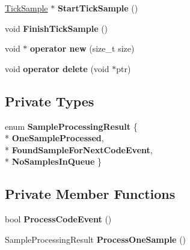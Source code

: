 \begin{DoxyCompactItemize}
\item 
\hyperlink{structv8_1_1internal_1_1_tick_sample}{Tick\+Sample} $\ast$ {\bfseries Start\+Tick\+Sample} ()\hypertarget{classv8_1_1internal_1_1_profiler_events_processor_a10c94b12e3cabf79f33f1e0bd8281dff}{}\label{classv8_1_1internal_1_1_profiler_events_processor_a10c94b12e3cabf79f33f1e0bd8281dff}

\item 
void {\bfseries Finish\+Tick\+Sample} ()\hypertarget{classv8_1_1internal_1_1_profiler_events_processor_a142c38fa289330b932097ac0705bf6ac}{}\label{classv8_1_1internal_1_1_profiler_events_processor_a142c38fa289330b932097ac0705bf6ac}

\item 
void $\ast$ {\bfseries operator new} (size\+\_\+t size)\hypertarget{classv8_1_1internal_1_1_profiler_events_processor_ac90fe204c70433ce94e4125125b78b47}{}\label{classv8_1_1internal_1_1_profiler_events_processor_ac90fe204c70433ce94e4125125b78b47}

\item 
void {\bfseries operator delete} (void $\ast$ptr)\hypertarget{classv8_1_1internal_1_1_profiler_events_processor_a9595db1768685aaba247596a6ea5e8f7}{}\label{classv8_1_1internal_1_1_profiler_events_processor_a9595db1768685aaba247596a6ea5e8f7}

\end{DoxyCompactItemize}
\subsection*{Private Types}
\begin{DoxyCompactItemize}
\item 
enum {\bfseries Sample\+Processing\+Result} \{ \\*
{\bfseries One\+Sample\+Processed}, 
\\*
{\bfseries Found\+Sample\+For\+Next\+Code\+Event}, 
\\*
{\bfseries No\+Samples\+In\+Queue}
 \}\hypertarget{classv8_1_1internal_1_1_profiler_events_processor_a1e04e270f39aeb3c99488ce1e65eb154}{}\label{classv8_1_1internal_1_1_profiler_events_processor_a1e04e270f39aeb3c99488ce1e65eb154}

\end{DoxyCompactItemize}
\subsection*{Private Member Functions}
\begin{DoxyCompactItemize}
\item 
bool {\bfseries Process\+Code\+Event} ()\hypertarget{classv8_1_1internal_1_1_profiler_events_processor_af06c8e8eb22d0da1dc1e9edbbabca0d2}{}\label{classv8_1_1internal_1_1_profiler_events_processor_af06c8e8eb22d0da1dc1e9edbbabca0d2}

\item 
Sample\+Processing\+Result {\bfseries Process\+One\+Sample} ()\hypertarget{classv8_1_1internal_1_1_profiler_events_processor_a5ba820307df9374333f4419fe5428b05}{}\label{classv8_1_1internal_1_1_profiler_events_processor_a5ba820307df9374333f4419fe5428b05}

\end{DoxyCompactItemize}
